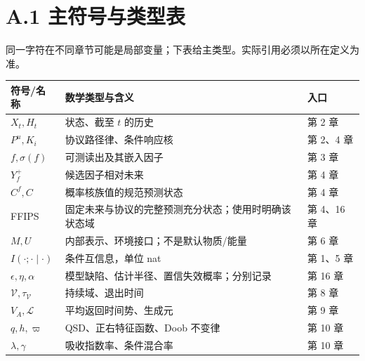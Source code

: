\documentclass[
  11pt,
  oneside]{book}
\newcounter{none} %
\begin{document}
\section{A.1 主符号与类型表}\label{a.1-ux4e3bux7b26ux53f7ux4e0eux7c7bux578bux8868}

同一字符在不同章节可能是局部变量；下表给主类型。实际引用必须以所在定义为准。

{\def\LTcaptype{none} %
\begin{longtable}[]{@{}
  >{\raggedright\arraybackslash}p{}
  >{\raggedright\arraybackslash}p{}
  >{\raggedright\arraybackslash}p{}@{}}
\toprule\noalign{}
\begin{minipage}[b]{\linewidth}\raggedright
符号/名称
\end{minipage} & \begin{minipage}[b]{\linewidth}\raggedright
数学类型与含义
\end{minipage} & \begin{minipage}[b]{\linewidth}\raggedright
入口
\end{minipage} \\
\midrule\noalign{}
\endhead
\bottomrule\noalign{}
\endlastfoot
\(X_t,H_t\) & 状态、截至 \(t\) 的历史 & 第 2 章 \\
\(P^u,K_i\) & 协议路径律、条件响应核 & 第 2、4 章 \\
\(f,\sigma(f)\) & 可测读出及其嵌入因子 & 第 3 章 \\
\(Y_f^+\) & 候选因子相对未来 & 第 4 章 \\
\(C^f,C\) & 概率核族值的规范预测状态 & 第 4 章 \\
FFIPS & 固定未来与协议的完整预测充分状态；使用时明确该状态域 & 第 4、16 章 \\
\(M,U\) & 内部表示、环境接口；不是默认物质/能量 & 第 6 章 \\
\(I(\cdot;\cdot\mid\cdot)\) & 条件互信息，单位 nat & 第 1、5 章 \\
\(\epsilon,\eta,\alpha\) & 模型缺陷、估计半径、置信失效概率；分别记录 & 第 16 章 \\
\(\mathcal V,\tau_{\mathcal V}\) & 持续域、退出时间 & 第 8 章 \\
\(V_A,\mathcal L\) & 平均返回时间势、生成元 & 第 9 章 \\
\(q,h,\varpi\) & QSD、正右特征函数、Doob 不变律 & 第 10 章 \\
\(\lambda,\gamma\) & 吸收指数率、条件混合率 & 第 10 章 \\

\end{longtable}}
\end{document}
